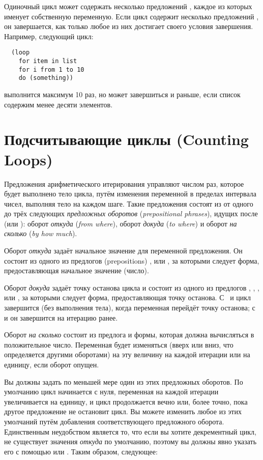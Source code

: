 Одиночный цикл может содержать несколько предложений , каждое из которых именует
собственную переменную. Если цикл содержит несколько предложений , он
завершается, как только любое из них достигает своего условия завершения. Например,
следующий цикл:

\begin{lstlisting}
  (loop
    for item in list
    for i from 1 to 10
    do (something))
\end{lstlisting}

выполнится максимум 10 раз, но может завершиться и раньше, если список содержим менее
десяти элементов.

\section{Подсчитывающие циклы (Counting Loops)}

Предложения арифметического итерирования управляют числом раз, которое будет выполнено
тело цикла, путём изменения переменной в пределах интервала чисел, выполняя тело на каждом
шаге. Такие предложения состоят из от одного до трёх сле\-дую\-щих \textit{предложных
  оборотов} (\textit{prepositional phrases}), идущих после  (или ):
оборот \textit{откуда} (\textit{from where}), оборот \textit{докуда} (\textit{to where}) и
оборот \textit{на сколько} (\textit{by how much}).

Оборот \textit{откуда} задаёт начальное значение для переменной предложения. Он состоит из
одного из предлогов (prepositions) ,  или , за
которыми следует форма, предоставляющая начальное значение (число).

Оборот \textit{докуда} задаёт точку останова цикла и состоит из одного из предлогов
, , ,  или , за которыми следует
форма, предоставляющая точку останова. С~ и  цикл завершится (без
выполнения тела), когда переменная перейдёт точку останова; с  и 
он завершится на итерацию ранее.

Оборот \textit{на сколько} состоит из предлога  и формы, которая должна
вычисляться в положительное число. Переменная будет изменяться (вверх или вниз, что
определяется другими оборотами) на эту величину на каждой итерации или на единицу, если
оборот опущен.

Вы должны задать по меньшей мере один из этих предложных оборотов. По умолчанию цикл
начинается с нуля, переменная на каждой итерации увеличивается на единицу, и цикл
продолжается вечно или, более точно, пока другое предложение не остановит цикл. Вы можете
изменить любое из этих умолчаний путём добавления соответствующего предложного
оборота. Единственным неудобством является то, что если вы хотите декрементный цикл, не
существует значения \textit{откуда} по умолчанию, поэтому вы должны явно указать его с
помощью  или . Таким образом, следующее:

